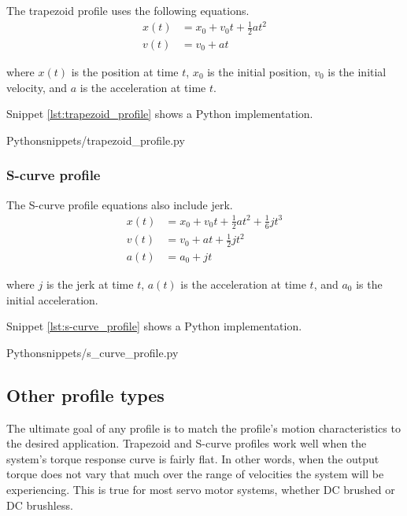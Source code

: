 The trapezoid profile uses the following equations.
\begin{align*}
  x(t) &= x_0 + v_0t + \frac{1}{2}at^2 \\
  v(t) &= v_0 + at
\end{align*}

where $x(t)$ is the position at time $t$, $x_0$ is the initial position, $v_0$
is the initial velocity, and $a$ is the acceleration at time $t$.

Snippet \ref{lst:trapezoid_profile} shows a Python implementation.
\begin{coderemote}{Python}{snippets/trapezoid_profile.py}
  \caption{Trapezoid profile implementation in Python}
  \label{lst:trapezoid_profile}
\end{coderemote}

\subsubsection{S-curve profile}

The S-curve profile equations also include jerk.
\begin{align*}
  x(t) &= x_0 + v_0t + \frac{1}{2}at^2 + \frac{1}{6}jt^3 \\
  v(t) &= v_0 + at + \frac{1}{2}jt^2 \\
  a(t) &= a_0 + jt
\end{align*}

where $j$ is the jerk at time $t$, $a(t)$ is the acceleration at time $t$, and
$a_0$ is the initial acceleration.

Snippet \ref{lst:s-curve_profile} shows a Python implementation.
\begin{coderemote}{Python}{snippets/s_curve_profile.py}
  \caption{S-curve profile implementation in Python}
  \label{lst:s-curve_profile}
\end{coderemote}

\subsection{Other profile types}

The ultimate goal of any profile is to match the profile's motion
characteristics to the desired application. Trapezoid and S-curve profiles work
well when the \gls{system}'s torque response curve is fairly flat. In other
words, when the output torque does not vary that much over the range of
velocities the \gls{system} will be experiencing. This is true for most servo
motor systems, whether DC brushed or DC brushless.

